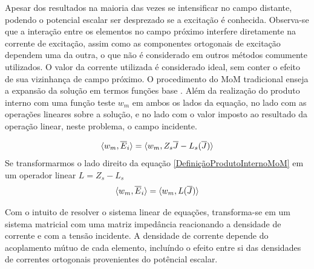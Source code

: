 \documentclass[
	12pt,				%
	openright,			%
	oneside,			%
	a4paper,			%
	english,			%
	brazil				%
	]{abntex2}
\begin{document}
Apesar dos resultados na maioria das vezes se intensificar no campo distante, podendo o potencial escalar ser desprezado se a excitação é conhecida. Observa-se que a interação entre os elementos no campo próximo interfere diretamente na corrente de excitação, assim como as componentes ortogonais de excitação dependem uma da outra, o que não é considerado em outros métodos comumente utilizados. O valor da corrente utilizada é considerado ideal, sem conter o efeito de sua vizinhança de campo próximo.
O procedimento do MoM tradicional enseja a expansão da solução em termos funções base . Além da realização do produto interno com uma função teste $w_m$ em ambos os lados da equação, no lado com as operações lineares sobre a solução, e no lado com o valor imposto ao resultado da operação linear, neste problema, o campo incidente.

\begin{equation}{\label{DefiniçãoProdutoInternoMoM}}
    \langle w_m,\overline{E}_i \rangle=  \langle w_m,Z_s\overline{J}-L_s(\overline{J})\rangle
\end{equation}
Se transformarmos o lado direito da equação \ref{DefiniçãoProdutoInternoMoM} em um operador linear $L=Z_s -L_s$ 
\begin{equation}{\label{DefiniçãoProdutoInternoLMoM}}
 \langle w_m,\overline{E}_i \rangle=  \langle w_m,L(\overline{J})\rangle
\end{equation}

Com o intuito de resolver o sistema linear de equações, transforma-se em um sistema matricial com uma matriz impedância reacionando a densidade de corrente e com a tensão incidente. A densidade de corrente depende  do acoplamento mútuo de cada elemento, incluíndo o efeito entre si das densidades de correntes ortogonais provenientes do potêncial escalar. 
\end{document}
